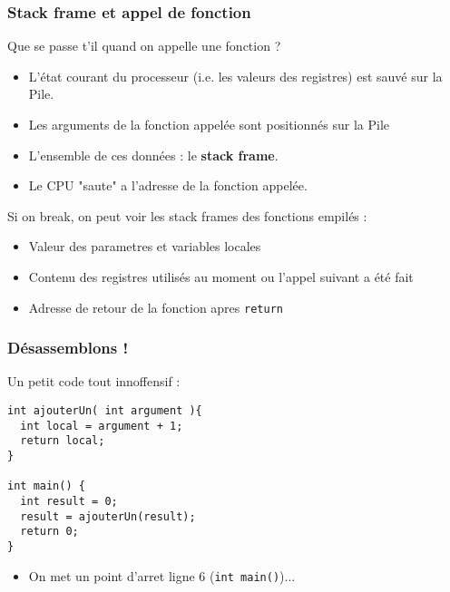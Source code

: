 \documentclass{beamer}
\begin{document}
\begin{frame}
\frametitle{Stack frame et appel de fonction}
Que se passe t'il quand on appelle une fonction ?
\begin{itemize}
\item L'état courant du processeur (i.e. les valeurs des registres) est sauvé sur la Pile.
\item Les arguments de la fonction appelée sont positionnés sur la Pile
\item L'ensemble de ces données : le \textbf{stack frame}.
\item Le CPU "saute" a l'adresse de la fonction appelée.
\end{itemize}
Si on break, on peut voir les stack frames des fonctions empilés :
\begin{itemize}
\item Valeur des parametres et variables locales
\item Contenu des registres utilisés au moment ou l'appel suivant a été fait
\item Adresse de retour de la fonction apres \lstinline+return+
\end{itemize} 
\end{frame}


\begin{frame}[fragile]
\frametitle{Désassemblons !}
Un petit code tout innoffensif :
\begin{lstlisting}
int ajouterUn( int argument ){
  int local = argument + 1;
  return local;
}

int main() {
  int result = 0;
  result = ajouterUn(result);
  return 0;
}
\end{lstlisting}
\begin{itemize}
\item On met un point d'arret ligne 6 (\lstinline+int main()+)...
\end{itemize}
\end{frame}
\end{document}
